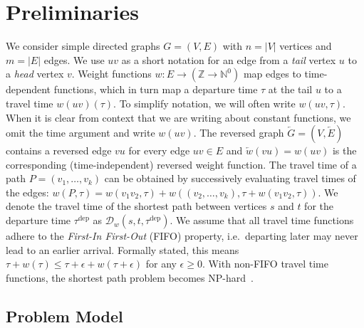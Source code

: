\documentclass[a4paper,UKenglish,cleveref, autoref, thm-restate,anonymous]{lipics-v2021}
\newcommand*{\dist}{\mathcal{D}}
\newcommand*{\tdep}{\tau^{\operatorname{dep}}}
\begin{document}
\section{Preliminaries}
We consider simple directed graphs $G=(V,E)$ with $n=|V|$ vertices and $m=|E|$ edges.
We use $uv$ as a short notation for an edge from a \emph{tail} vertex $u$ to a \emph{head} vertex $v$.
Weight functions $w : E \to (\mathbb{Z} \to \mathbb{N}^0)$ map edges to time-dependent functions, which in turn map a departure time $\tau$ at the tail $u$ to a travel time $w(uv)(\tau)$.
To simplify notation, we will often write $w(uv, \tau)$.
When it is clear from context that we are writing about constant functions, we omit the time argument and write $w(uv)$.
The reversed graph $\overleftarrow{G} = (V, \overleftarrow{E})$ contains a reversed edge $vu$ for every edge $uv \in E$ and $\overleftarrow{w}(vu) = w(uv)$ is the corresponding (time-independent) reversed weight function.
The travel time of a path $P = (v_1,\dots,v_k)$ can be obtained by successively evaluating travel times of the edges: $w(P, \tau) = w(v_1 v_2, \tau) + w((v_2,\dots,v_k), \tau + w(v_1 v_2, \tau))$.
We denote the travel time of the shortest path between vertices $s$ and $t$ for the departure time $\tdep$ as $\dist_w(s,t,\tdep)$.
We assume that all travel time functions adhere to the \emph{First-In First-Out} (FIFO) property, i.e.\ departing later may never lead to an earlier arrival.
Formally stated, this means $\tau + w(\tau) \leq \tau + \epsilon + w(\tau + \epsilon)$ for any $\epsilon \geq 0$.
With non-FIFO travel time functions, the shortest path problem becomes \textsf{NP}-hard~\cite{or-tnp-89}.

\subsection{Problem Model}
\end{document}

